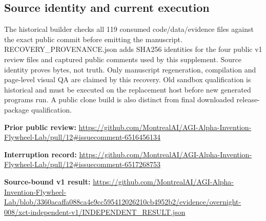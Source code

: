 \documentclass[11pt,letterpaper]{article}
\begin{document}
\subsection*{Source identity and current execution}
The historical builder checks all 119 consumed code/data/evidence files against the exact public commit before emitting the manuscript. RECOVERY\_PROVENANCE.json adds SHA256 identities for the four public v1 review files and captured public comments used by this supplement. Source identity proves bytes, not truth. Only manuscript regeneration, compilation and page-level visual QA are claimed by this recovery. Old sandbox qualification is historical and must be executed on the replacement host before new generated programs run. A public clone build is also distinct from final downloaded release-package qualification.\par
\textbf{Prior public review:} \url{https://github.com/MontrealAI/AGI-Alpha-Invention-Flywheel-Lab/pull/12#issuecomment-6516456134}\par
\textbf{Interruption record:} \url{https://github.com/MontrealAI/AGI-Alpha-Invention-Flywheel-Lab/pull/12#issuecomment-6517268753}\par
\textbf{Source-bound v1 result:} \url{https://github.com/MontrealAI/AGI-Alpha-Invention-Flywheel-Lab/blob/3360acaffa088ca4e9cc595412026210cb4952b2/evidence/overnight-008/xct-independent-v1/INDEPENDENT_RESULT.json}\par
\end{document}
